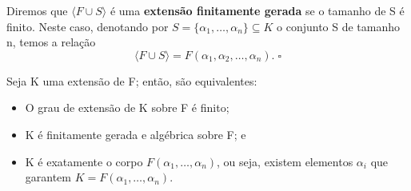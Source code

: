 \documentclass[../algebraIII_notes.tex]{subfiles}
\begin{document}
\begin{def*}
	Diremos que \(\langle F\cup S \rangle\) é uma \textbf{extensão finitamente gerada} se o tamanho de S é finito. Neste caso, denotando por \(S=\{\alpha_1,\dotsc ,\alpha_{n}\}\subseteq K\) o conjunto S de tamanho n, temos a relação
	\[
		\langle F\cup S \rangle=F(\alpha_1,\alpha_2,\dotsc ,\alpha_{n}). \; \square
	\]
\end{def*}
\begin{prop*}
	Seja K uma extensão de F; então, são equivalentes:
	\begin{itemize}
		\item[1)] O grau de extensão de K sobre F é finito;
		\item[2)] K é finitamente gerada e algébrica sobre F; e
		\item[3)] K é exatamente o corpo \(F(\alpha_1,\dotsc , \alpha_{n})\), ou seja, existem elementos \(\alpha_{i}\) que garantem \(K=F(\alpha_1,\dotsc ,\alpha_{n})\).
	\end{itemize}
\end{prop*}
\end{document}
